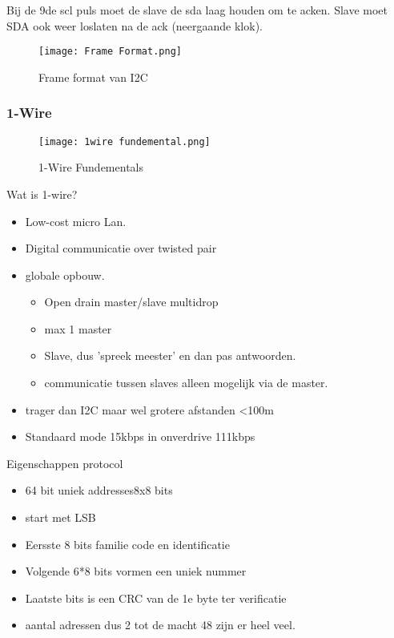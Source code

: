Bij de 9de scl puls moet de slave de sda laag houden om te acken. Slave moet SDA ook weer loslaten na de ack
(neergaande klok).

\begin{figure}[H]
    \centering
    \texttt{[image: Frame Format.png]}
    \caption*{Frame format van I2C}
    \end{figure}

\subsubsection{1-Wire}
\begin{figure}[H]
    \centering
    \texttt{[image: 1wire fundemental.png]}
    \caption*{1-Wire Fundementals}
    \end{figure}

Wat is 1-wire?
\begin{itemize}
    \item Low-cost micro Lan.
    \item Digital communicatie over twisted pair
    \item globale opbouw.
    \begin{itemize}
        \item Open drain master/slave multidrop
        \item max 1 master
        \item Slave, dus 'spreek meester' en dan pas antwoorden.
        \item communicatie tussen slaves alleen mogelijk via de master.
    \end{itemize}
    \item trager dan I2C maar wel grotere afstanden <100m
    \item Standaard mode 15kbps in onverdrive 111kbps
\end{itemize}

\vspace{0.5cm}
Eigenschappen protocol
\begin{itemize}
    \item 64 bit uniek addresses8x8 bits
    \item start met LSB
    \item Eersste 8 bits familie code en identificatie
    \item Volgende 6*8 bits vormen een uniek nummer
    \item Laatste  bits is een CRC van de 1e byte ter verificatie
    \item aantal adressen dus 2 tot de macht 48 zijn er heel veel.
\end{itemize}

